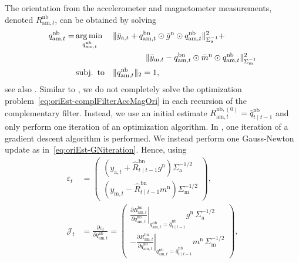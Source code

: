 The orientation from the accelerometer and magnetometer measurements, denoted $R_{\text{am},t}^\text{nb}$, can be obtained by solving
\begin{align}
\label{eq:oriEst-complFilterAccMagOri}
q_{\text{am},t}^\text{nb} =& \operatorname*{arg \, min \,}_{q_{\text{am},t}^\text{nb}} &&\| \bar{y}_{\text{a},t} + q_{\text{am},t}^\text{bn} \odot \bar{g}^\text{n} \odot q_{\text{am},t}^\text{nb} \|^2_{\Sigma_{\text{a}}^{-1}} + \nonumber \\
& && \qquad \qquad \| \bar{y}_{\text{m},t} - q_{\text{am},t}^\text{bn} \odot \bar{m}^\text{n} \odot q_{\text{am},t}^\text{nb} \|^2_{\Sigma_{\text{m}}^{-1}} \nonumber \\
& \operatorname*{subj. \ to} &&\| q_{\text{am},t}^\text{nb} \|_2 = 1,
\end{align}
see also . Similar to \cite{madgwickHV:2011}, we do not completely solve the optimization problem~\eqref{eq:oriEst-complFilterAccMagOri} in each recursion of the complementary filter. Instead, we use an initial estimate $R_{\text{am},t}^{\text{nb},(0)} = \hat{q}^\text{nb}_{t \mid t-1}$ and only perform one iteration of an optimization algorithm. In \cite{madgwickHV:2011}, one iteration of a gradient descent algorithm is performed. We instead perform one Gauss-Newton update as in~\eqref{eq:oriEst-GNiteration}. Hence, using 
\begin{subequations}
\label{eq:oriEst-complFilterAccMagUpdateJe}
\begin{align}
\varepsilon_t &= \begin{pmatrix} \left( y_{\text{a},t} + \hat{R}^\text{bn}_{t \mid t-1} g^\text{n} \right) \Sigma_\text{a}^{-1/2} \\ \left( y_{\text{m},t} - \hat{R}^\text{bn}_{t \mid t-1} m^\text{n} \right) \Sigma_\text{m}^{-1/2} \end{pmatrix}, \\
\mathcal{J}_t &= \tfrac{\partial \varepsilon_t}{\partial q_{\text{am},t}^\text{nb}} = \begin{pmatrix} \left. \tfrac{\partial R_{\text{am},t}^\text{bn}}{\partial q_{\text{am},t}^\text{nb}} \right|_{q_{\text{am},t}^\text{nb}=\hat{q}^\text{nb}_{t \mid t-1}} g^\text{n} \, \Sigma_\text{a}^{-1/2} \\ \left. - \tfrac{\partial R_{\text{am},t}^\text{bn}}{\partial q_{\text{am},t}^\text{nb}} \right|_{q_{\text{am},t}^\text{nb}=\hat{q}^\text{nb}_{t \mid t-1}} m^\text{n} \, \Sigma_\text{m}^{-1/2} \end{pmatrix}, \label{eq:oriEst-complFilterAccMagUpdateJ}
\end{align}
\end{subequations}
